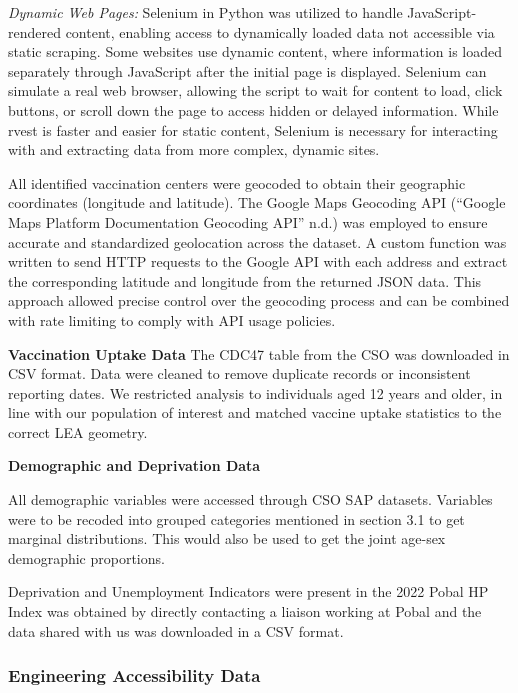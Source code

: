\documentclass{article}
\begin{document}
\emph{Dynamic Web Pages:} Selenium in Python was utilized to handle
JavaScript-rendered content, enabling access to dynamically loaded data
not accessible via static scraping. Some websites use dynamic content,
where information is loaded separately through JavaScript after the
initial page is displayed. Selenium can simulate a real web browser,
allowing the script to wait for content to load, click buttons, or
scroll down the page to access hidden or delayed information. While
rvest is faster and easier for static content, Selenium is necessary for
interacting with and extracting data from more complex, dynamic sites.

All identified vaccination centers were geocoded to obtain their
geographic coordinates (longitude and latitude). The Google Maps
Geocoding API ({``Google {Maps} {Platform} {Documentation} {\textbar}
{Geocoding} {API}''} n.d.) was employed to ensure accurate and
standardized geolocation across the dataset. A custom function was
written to send HTTP requests to the Google API with each address and
extract the corresponding latitude and longitude from the returned JSON
data. This approach allowed precise control over the geocoding process
and can be combined with rate limiting to comply with API usage
policies.

\textbf{Vaccination Uptake Data} The CDC47 table from the CSO was
downloaded in CSV format. Data were cleaned to remove duplicate records
or inconsistent reporting dates. We restricted analysis to individuals
aged 12 years and older, in line with our population of interest and
matched vaccine uptake statistics to the correct LEA geometry.

\textbf{Demographic and Deprivation Data}

All demographic variables were accessed through CSO SAP datasets.
Variables were to be recoded into grouped categories mentioned in
section 3.1 to get marginal distributions. This would also be used to
get the joint age-sex demographic proportions.

Deprivation and Unemployment Indicators were present in the 2022 Pobal
HP Index was obtained by directly contacting a liaison working at Pobal
and the data shared with us was downloaded in a CSV format.

\subsubsection{Engineering Accessibility
Data}\label{engineering-accessibility-data}
\end{document}
